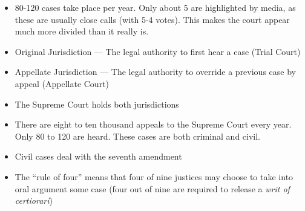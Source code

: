 \documentclass[12pt]{article}
\begin{document}
\begin{itemize}
  \item 80-120 cases take place per year. Only about 5 are highlighted by media, as these are usually close calls (with 5-4 votes). This makes the court appear much more divided than it really is.

  \item Original Jurisdiction — The legal authority to first hear a case (Trial Court)

  \item Appellate Jurisdiction — The legal authority to override a previous case by appeal (Appellate Court)

  \item The Supreme Court holds both jurisdictions

  \item There are eight to ten thousand appeals to the Supreme Court every year. Only 80 to 120 are heard. These cases are both criminal and civil.

  \item Civil cases deal with the seventh amendment

  \item The “rule of four” means that four of nine justices may choose to take into oral argument some case (four out of nine are required to release a \textit{writ of certiorari})

\end{itemize}
\end{document}
